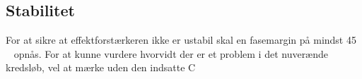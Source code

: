 \subsection{Stabilitet}
\label{effektforstaerker-stabilitet}

For at sikre at effektforstærkeren ikke er ustabil skal en fasemargin på mindst 45 \degrees~ opnås. For at kunne vurdere hvorvidt der er et problem i det nuverænde kredsløb, vel at mærke uden den indsatte C